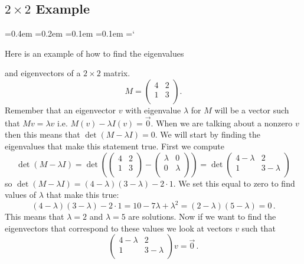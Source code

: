 
\subsection*{$2 \times 2$ Example}

{\ttfamily
{}\font=0.4em
\font=0.2em
\font=0.1em
\font=0.1em
\hyphenchar\font=`\-


\hypertarget{scripts_eigenvalseigenvects_example}{Here is an example of how to find the eigenvalues} and eigenvectors of a $2 \times 2$ matrix.
\[
M = 
\begin{pmatrix}
4 & 2\\
1 & 3\\ 
\end{pmatrix}.
\]
Remember that an eigenvector $v$ with eigenvalue $\lambda$ for $M$ will be a vector such that $Mv = \lambda v$ i.e. $M(v) - \lambda I (v) = \vec{0}$. When we are talking about a nonzero $v$ then this means that $\det (M - \lambda I) = 0$. We will start by finding the eigenvalues that make this statement true. First we compute
 \[
 \det (M - \lambda I) = \det \left(
\begin{pmatrix}
4 & 2\\
1 & 3\\ 
\end{pmatrix} -
\begin{pmatrix}
\lambda & 0\\
0 & \lambda\\ 
\end{pmatrix} \right)
= 
\det 
\begin{pmatrix}
4-\lambda & 2\\
1 & 3-\lambda \\ 
\end{pmatrix} 
\]
so $ \det (M - \lambda I)= (4-\lambda)(3-\lambda ) - 2\cdot1$. We set this equal to zero to find values of $\lambda$ that make this true:
\[
(4-\lambda)(3-\lambda ) - 2\cdot1 = 10-7\lambda +\lambda^2 = (2-\lambda)(5-\lambda) = 0\, .
\]
This means that $\lambda= 2$ and $\lambda= 5$ are solutions. Now if we want to find the eigenvectors that correspond to these values we look at vectors $v$ such that 
\[
\begin{pmatrix}
4-\lambda & 2\\
1 & 3-\lambda \\ 
\end{pmatrix} v = \vec 0 \, .
\]

}

